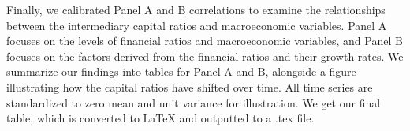 Finally, we calibrated Panel A and B correlations to examine the relationships between the intermediary capital ratios and macroeconomic variables. Panel A focuses on the levels of financial ratios and macroeconomic variables, and Panel B focuses on the factors derived from the financial ratios and their growth rates. We summarize our findings into tables for Panel A and B, alongside a figure illustrating how the capital ratios have shifted over time. All time series are standardized to zero mean and unit variance for illustration. We get our final table, which is converted to LaTeX and outputted to a .tex file.